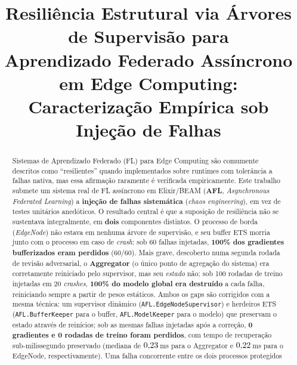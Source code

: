 \documentclass[conference,a4paper]{IEEEtran}
\begin{document}
\title{%
  \textbf{Resiliência Estrutural via Árvores de Supervisão para\\
  Aprendizado Federado Assíncrono em Edge Computing:\\
  Caracterização Empírica sob Injeção de Falhas}%
}

\author{%
}

\maketitle

\begin{abstract}
Sistemas de Aprendizado Federado (FL) para Edge Computing são comumente
descritos como ``resilientes'' quando implementados sobre runtimes com
tolerância a falhas nativa, mas essa afirmação raramente é verificada
empiricamente. Este trabalho submete um sistema real de FL assíncrono em
Elixir/BEAM (\textbf{AFL}, \textit{Asynchronous Federated Learning}) a
\textbf{injeção de falhas sistemática} (\textit{chaos engineering}), em
vez de testes unitários anedóticos. O resultado central é que a
suposição de resiliência não se
sustentava integralmente, em \textbf{dois} componentes distintos. O
processo de borda (\textit{EdgeNode}) não estava em nenhuma árvore de
supervisão, e seu buffer ETS morria junto com o processo em caso de
\textit{crash}: sob 60 falhas injetadas, \textbf{100\% dos gradientes
bufferizados eram perdidos} (60/60). Mais grave, descoberto numa segunda
rodada de revisão adversarial, o \textbf{Aggregator} (o único ponto de
agregação do sistema) era corretamente reiniciado pelo supervisor, mas
seu \emph{estado} não; sob 100 rodadas de treino injetadas em 20
\textit{crashes}, \textbf{100\% do modelo global era destruído} a cada
falha, reiniciando sempre a partir de pesos estáticos. Ambos os gaps são
corrigidos com a mesma técnica: um supervisor dinâmico
(\texttt{AFL.EdgeNodeSupervisor}) e herdeiros ETS
(\texttt{AFL.BufferKeeper} para o buffer, \texttt{AFL.ModelKeeper} para o
modelo) que preservam o estado através de reinícios; sob as mesmas falhas
injetadas após a correção, \textbf{0 gradientes e 0 rodadas de treino
foram perdidos}, com tempo de recuperação sub-milissegundo preservado
(mediana de $0{,}23$\,ms para o Aggregator e $0{,}22$\,ms para o EdgeNode,
respectivamente). Uma falha concorrente entre os dois processos protegidos

\end{abstract}
\end{document}
